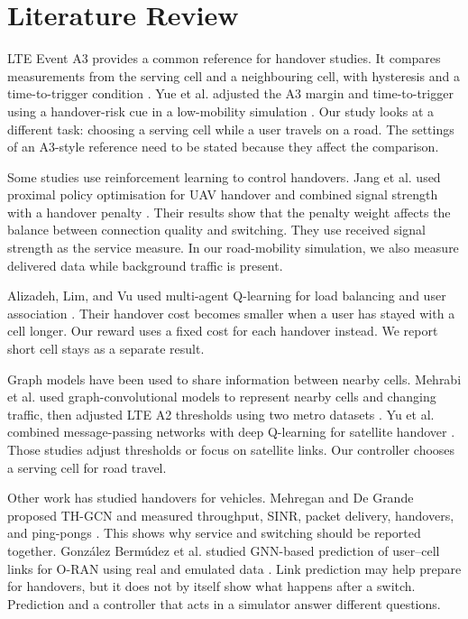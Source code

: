 \documentclass[fleqn,10pt,twoside]{IOEGC}
\begin{document}
\section{Literature Review}
LTE Event A3 provides a common reference for handover studies. It compares measurements from the serving cell and a neighbouring cell, with hysteresis and a time-to-trigger condition \cite{3gpp36}. Yue et al. adjusted the A3 margin and time-to-trigger using a handover-risk cue in a low-mobility simulation \cite{yue2026}. Our study looks at a different task: choosing a serving cell while a user travels on a road. The settings of an A3-style reference need to be stated because they affect the comparison.

Some studies use reinforcement learning to control handovers. Jang et al. used proximal policy optimisation for UAV handover and combined signal strength with a handover penalty \cite{jang2022}. Their results show that the penalty weight affects the balance between connection quality and switching. They use received signal strength as the service measure. In our road-mobility simulation, we also measure delivered data while background traffic is present.

Alizadeh, Lim, and Vu used multi-agent Q-learning for load balancing and user association \cite{alizadeh2024}. Their handover cost becomes smaller when a user has stayed with a cell longer. Our reward uses a fixed cost for each handover instead. We report short cell stays as a separate result.

Graph models have been used to share information between nearby cells. Mehrabi et al. used graph-convolutional models to represent nearby cells and changing traffic, then adjusted LTE A2 thresholds using two metro datasets \cite{mehrabi2023}. Yu et al. combined message-passing networks with deep Q-learning for satellite handover \cite{yu2024}. Those studies adjust thresholds or focus on satellite links. Our controller chooses a serving cell for road travel.

Other work has studied handovers for vehicles. Mehregan and De Grande proposed TH-GCN and measured throughput, SINR, packet delivery, handovers, and ping-pongs \cite{mehregan2025}. This shows why service and switching should be reported together. González Bermúdez et al. studied GNN-based prediction of user--cell links for O-RAN using real and emulated data \cite{gonzalez2025}. Link prediction may help prepare for handovers, but it does not by itself show what happens after a switch. Prediction and a controller that acts in a simulator answer different questions.
\end{document}
